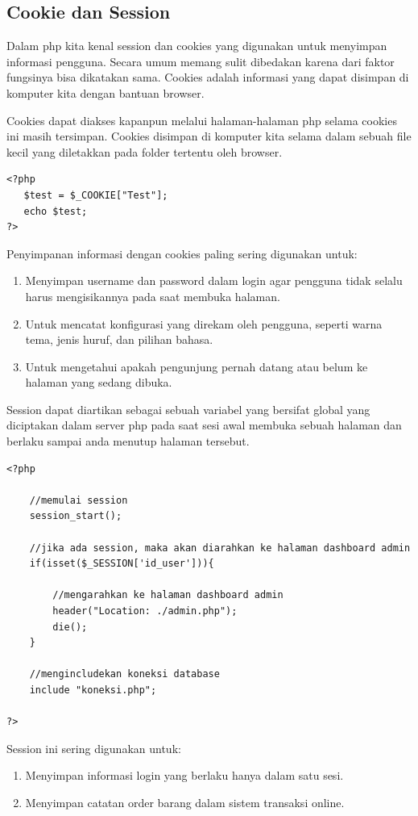 \subsection{Cookie dan Session}
Dalam php kita kenal session dan cookies yang digunakan untuk menyimpan informasi pengguna. Secara umum memang sulit dibedakan karena dari faktor fungsinya bisa dikatakan sama. Cookies adalah informasi yang dapat disimpan di komputer kita dengan bantuan browser. 
\par 
Cookies dapat diakses kapanpun melalui halaman-halaman php selama cookies ini masih tersimpan. Cookies disimpan di komputer kita selama dalam sebuah file kecil yang diletakkan pada folder tertentu oleh browser. 
\begin{lstlisting}
<?php
   $test = $_COOKIE["Test"];
   echo $test;
?> 
\end{lstlisting}
Penyimpanan informasi dengan cookies paling sering digunakan untuk:
\begin{enumerate}
\item Menyimpan username dan password dalam login agar pengguna tidak selalu harus mengisikannya pada saat membuka halaman.
\item Untuk mencatat konfigurasi yang direkam oleh pengguna, seperti warna tema, jenis huruf, dan pilihan bahasa.
\item Untuk mengetahui apakah pengunjung pernah datang atau belum ke halaman yang sedang dibuka.
\end{enumerate}
Session dapat diartikan sebagai sebuah variabel yang bersifat global yang diciptakan dalam server php pada saat sesi awal membuka sebuah halaman dan berlaku sampai anda menutup halaman tersebut.
\begin{lstlisting}
<?php

    //memulai session
    session_start();

    //jika ada session, maka akan diarahkan ke halaman dashboard admin
    if(isset($_SESSION['id_user'])){

        //mengarahkan ke halaman dashboard admin
        header("Location: ./admin.php");
        die();
    }

    //mengincludekan koneksi database
    include "koneksi.php";

?> 
\end{lstlisting}
Session ini sering digunakan untuk:
\begin{enumerate}
\item Menyimpan informasi login yang berlaku hanya dalam satu sesi.
\item Menyimpan catatan order barang dalam sistem transaksi online.
\end{enumerate}

